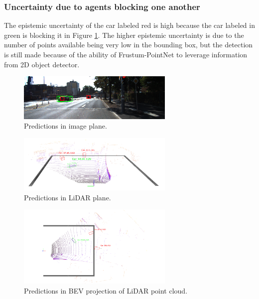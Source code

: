 \documentclass[10pt,twocolumn,letterpaper]{article}
\begin{document}
\subsubsection{Uncertainty due to agents blocking one another}
The epistemic uncertainty of the car labeled red is high because the car labeled in green is blocking it in Figure \ref{fig:Uncert_blockage-1_1}. The higher epistemic uncertainty is due to the number of points available being very low in the bounding box, but the detection is still made because of the ability of Frustum-PointNet to leverage information from 2D object detector.
\begin{figure}[!htbp]
        \centering
		\includegraphics[width=75mm, scale = 0.4]{images/Uncertainty_results/3461_overlap_bbox.png}
        \caption[Extracted frustum point cloud after Normalization]{Predictions in image plane.}
        \label{fig:Uncert_blockage-1_1}
\end{figure}
\begin{figure}[!htbp]
        \centering
		\includegraphics[width=75mm, scale = 0.4]{images/Uncertainty_results/3461_Follow_cam_view.png}
        \caption[Extracted frustum point cloud after Normalization]{Predictions in LiDAR plane.}
        \label{fig:Uncert_blockage-1_2}
\end{figure}
\begin{figure}[!htbp]
        \centering
		\includegraphics[width=75mm,scale = 0.4]{images/Uncertainty_results/3461_overlap.png}
        \caption[Extracted frustum point cloud after Normalization]{Predictions in BEV projection of LiDAR point cloud.}
        \label{fig:Uncert_blockage-1_3}
\end{figure}
\end{document}
